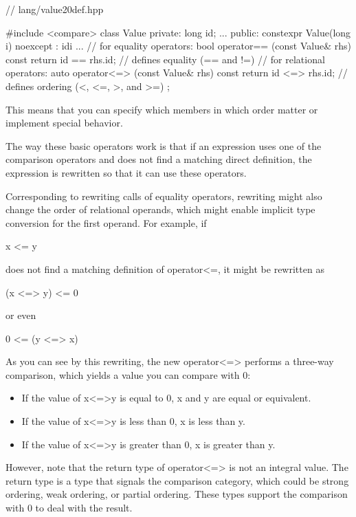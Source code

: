 \begin{cpp}
// lang/value20def.hpp

#include <compare>
class Value {
private:
	long id;
	...
public:
	constexpr Value(long i) noexcept
	: id{i} {
	}
	...
	// for equality operators:
	bool operator== (const Value& rhs) const {
		return id == rhs.id; // defines equality (== and !=)
	}
	// for relational operators:
	auto operator<=> (const Value& rhs) const {
		return id <=> rhs.id; // defines ordering (<, <=, >, and >=)
	}
};
\end{cpp}

This means that you can specify which members in which order matter or implement special behavior.

The way these basic operators work is that if an expression uses one of the comparison operators and does not find a matching direct definition, the expression is rewritten so that it can use these operators.

Corresponding to rewriting calls of equality operators, rewriting might also change the order of relational operands, which might enable implicit type conversion for the first operand. For example, if

\begin{cpp}
x <= y
\end{cpp}

does not find a matching definition of operator<=, it might be rewritten as

\begin{cpp}
(x <=> y) <= 0
\end{cpp}

or even

\begin{cpp}
0 <= (y <=> x)
\end{cpp}

As you can see by this rewriting, the new operator<=> performs a three-way comparison, which yields a value you can compare with 0:

\begin{itemize}
\item
If the value of x<=>y is equal to 0, x and y are equal or equivalent.

\item
If the value of x<=>y is less than 0, x is less than y.

\item
If the value of x<=>y is greater than 0, x is greater than y.
\end{itemize}

However, note that the return type of operator<=> is not an integral value. The return type is a type that signals the comparison category, which could be strong ordering, weak ordering, or partial ordering. These types support the comparison with 0 to deal with the result.










